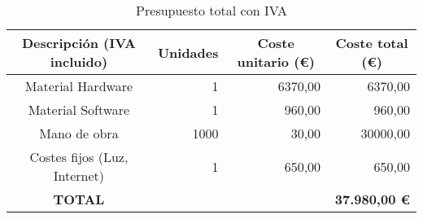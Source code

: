 \begin{table}[ht]
	\centering
	\begin{tabular}{|c|r|r|r|}
		\hline
		\rowcolor[HTML]{EFEFEF}
		\textbf{Descripción (IVA incluido)} & \multicolumn{1}{c|}{\cellcolor[HTML]{EFEFEF}\textbf{Unidades}}    & \multicolumn{1}{c|}{\cellcolor[HTML]{EFEFEF}\textbf{Coste unitario (€)}} & \multicolumn{1}{c|}{\cellcolor[HTML]{EFEFEF}\textbf{Coste total (€)}} \\ \hline
		Material Hardware                   & 1                                                                 & 6370,00                                                                  & 6370,00                                                               \\ \hline
		Material Software                   & 1                                                                 & 960,00                                                                   & 960,00                                                                \\ \hline
		Mano de obra                        & 1000                                                              & 30,00                                                                    & 30000,00                                                              \\ \hline
		Costes fijos (Luz, Internet)        & 1                                                                 & 650,00                                                                   & 650,00                                                                \\ \hline
		\rowcolor[HTML]{FFFFC7}
		\textbf{TOTAL}                      & \multicolumn{3}{r|}{\cellcolor[HTML]{FFFFC7}\textbf{37.980,00 €}}                                                                                                                                                    \\ \hline
	\end{tabular}
	\caption{Presupuesto total con IVA}
	\label{tab:budget}
\end{table}